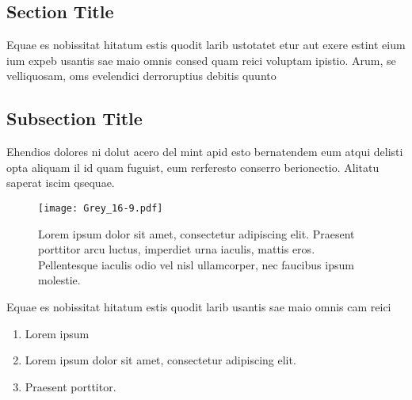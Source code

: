\documentclass[
]{ImperialPoster}
\begin{document}
\begin{multicols}{3}
	\columnbreak{} %


	\section{Section Title}

	Equae es nobissitat hitatum estis quodit larib ustotatet etur aut exere estint eium ium expeb usantis sae maio omnis consed quam reici voluptam ipistio. Arum, se velliquosam, oms evelendici derroruptius debitis quunto

	\subsection{Subsection Title}

	Ehendios \textcolor{ICLBlue}{dolores} ni dolut acero del mint apid esto bernatendem eum \textcolor{ICLBlue}{atqui delisti opta} aliquam il id quam fuguist, eum rerferesto conserro berionectio. Alitatu saperat iscim qsequae.

	\vspace{0.017\textheight} %

	\begin{figure}[H] %
		\texttt{[image: Grey\_16-9.pdf]} %
		\parbox[b]{0.66\textwidth}{\caption{Lorem ipsum dolor sit amet, consectetur adipiscing elit. Praesent porttitor arcu luctus, imperdiet urna iaculis, mattis eros. Pellentesque iaculis odio vel nisl ullamcorper, nec faucibus ipsum molestie.}} %
	\end{figure}


	Equae es nobissitat hitatum estis quodit larib usantis sae maio omnis cam reici


	\begin{enumerate}
		\item Lorem ipsum
		\item Lorem ipsum dolor sit amet, consectetur adipiscing elit.
		\item Praesent porttitor.
	\end{enumerate}


\end{multicols}
\end{document}
